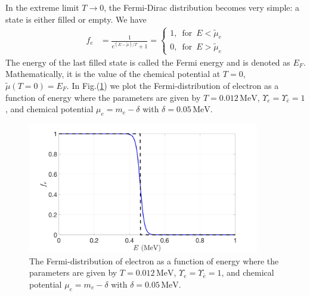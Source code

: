 \documentclass[onecolumn,preprintnumbers,amsmath,amssymb]{revtex4}
\begin{document}
In the extreme limit $T\rightarrow0$, the Fermi-Dirac distribution becomes very simple: a state is either filled or empty. We have
\begin{align}
f_e&=\frac{1}{e^{(E-\tilde{\mu})/T}+1}=\left\{\begin{array}{c}1,\,\,\,\mathrm{for}\,\,\,{E}<\tilde{\mu}_e \\0,\,\,\,\mathrm{for}\,\,\, {E}>\tilde{\mu}_e\end{array}\right.
\end{align}
The energy of the last filled state is called the Fermi energy and is denoted as $E_F$. Mathematically, it is the value of the chemical potential at $T=0$, $\tilde\mu(T = 0)=E_F$. In Fig.(\ref{Electron_001}) we plot the Fermi-distribution of electron as a function of energy where the parameters are given by $T=0.012\,\mathrm{MeV}$, $\Upsilon_e=\Upsilon_{\bar e}=1$, and chemical potential $\mu_e=m_e-\delta$ with $\delta=0.05\,\mathrm{MeV}$.
\begin{figure}[h]
\begin{center}
\includegraphics[width=0.9\textwidth]{./plot/Electron_distribution001}
\caption{The Fermi-distribution of electron as a function of energy where the parameters are given by $T=0.012\,\mathrm{MeV}$, $\Upsilon_e=\Upsilon_{\bar e}=1$, and chemical potential $\mu_e=m_e-\delta$ with $\delta=0.05\,\mathrm{MeV}$.}
\label{Electron_001}
\end{center}
\end{figure}

\end{document}
